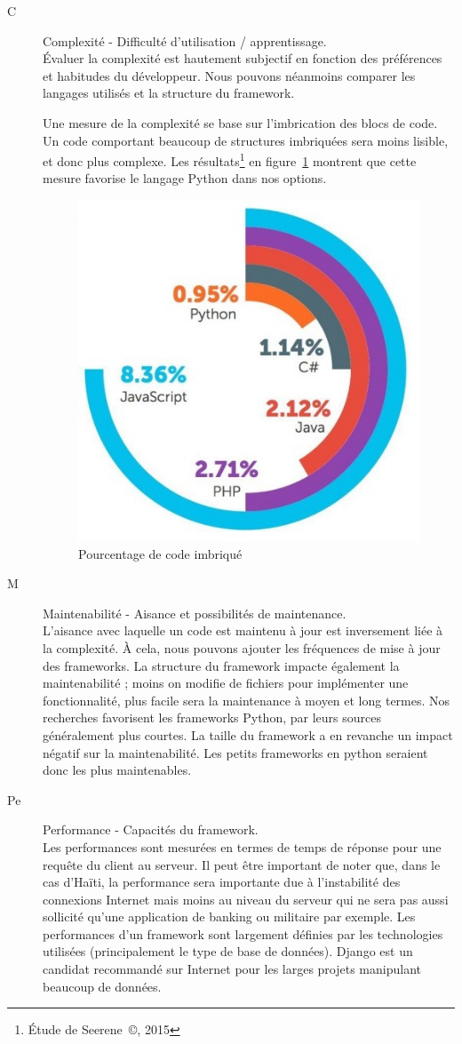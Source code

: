 \documentclass{EPL-master-thesis-covers-FR}
\begin{document}
					\begin{description}
						\item[C] Complexité - Difficulté d'utilisation / apprentissage. \hfill \\
							\'Evaluer la complexité est hautement subjectif en fonction des préférences et habitudes du développeur. Nous pouvons néanmoins comparer les langages utilisés et la structure du framework.

							Une mesure de la complexité se base sur l'imbrication des blocs de code. Un code comportant beaucoup de structures imbriquées sera moins lisible, et donc plus complexe. Les résultats\footnote{\'Etude de Seerene~\copyright, 2015} en figure~\ref{fig:complexity} montrent que cette mesure favorise le langage Python dans nos options.

							\begin{figure}
								\centering
								\includegraphics[width=.4\textwidth]{images/complexity}
								\caption{Pourcentage de code imbriqué}
								\label{fig:complexity}
							\end{figure}

					\item[M] Maintenabilité - Aisance et possibilités de maintenance. \hfill \\
							L'aisance avec laquelle un code est maintenu à jour est inversement liée à la complexité. À cela, nous pouvons ajouter les fréquences de mise à jour des frameworks. La structure du framework impacte également la maintenabilité ; moins on modifie de fichiers pour implémenter une fonctionnalité, plus facile sera la maintenance à moyen et long termes. Nos recherches favorisent les frameworks Python, par leurs sources généralement plus courtes. La taille du framework a en revanche un impact négatif sur la maintenabilité. Les petits frameworks en python seraient donc les plus maintenables.

					\item[Pe] Performance - Capacités du framework. \hfill \\
							Les performances sont mesurées en termes de temps de réponse pour une requête du client au serveur. Il peut être important de noter que, dans le cas d'Haïti, la performance sera importante due à l'instabilité des connexions Internet mais moins au niveau du serveur qui ne sera pas aussi sollicité qu'une application de banking ou militaire par exemple. Les performances d'un framework sont largement définies par les technologies utilisées (principalement le type de base de données). Django est un candidat recommandé sur Internet pour les larges projets manipulant beaucoup de données.


\end{description}
\end{document}
